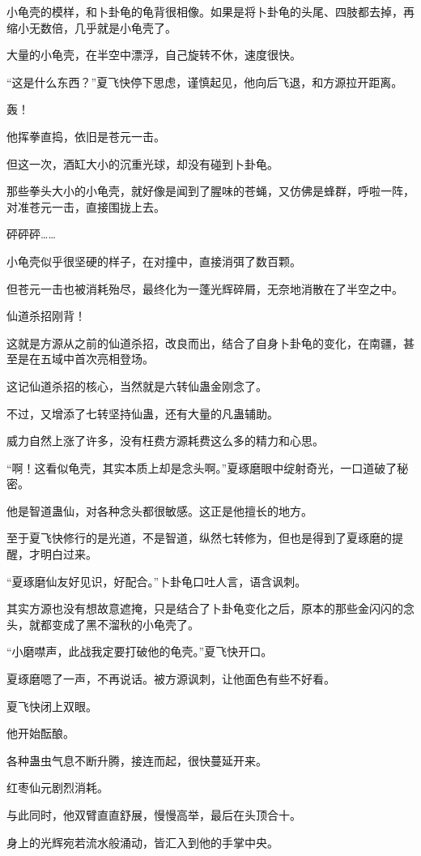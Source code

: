 \begin{this_body}
小龟壳的模样，和卜卦龟的龟背很相像。如果是将卜卦龟的头尾、四肢都去掉，再缩小无数倍，几乎就是小龟壳了。

大量的小龟壳，在半空中漂浮，自己旋转不休，速度很快。

“这是什么东西？”夏飞快停下思虑，谨慎起见，他向后飞退，和方源拉开距离。

轰！

他挥拳直捣，依旧是苍元一击。

但这一次，酒缸大小的沉重光球，却没有碰到卜卦龟。

那些拳头大小的小龟壳，就好像是闻到了腥味的苍蝇，又仿佛是蜂群，呼啦一阵，对准苍元一击，直接围拢上去。

砰砰砰……

小龟壳似乎很坚硬的样子，在对撞中，直接消弭了数百颗。

但苍元一击也被消耗殆尽，最终化为一蓬光辉碎屑，无奈地消散在了半空之中。

仙道杀招刚背！

这就是方源从之前的仙道杀招，改良而出，结合了自身卜卦龟的变化，在南疆，甚至是在五域中首次亮相登场。

这记仙道杀招的核心，当然就是六转仙蛊金刚念了。

不过，又增添了七转坚持仙蛊，还有大量的凡蛊辅助。

威力自然上涨了许多，没有枉费方源耗费这么多的精力和心思。

“啊！这看似龟壳，其实本质上却是念头啊。”夏琢磨眼中绽射奇光，一口道破了秘密。

他是智道蛊仙，对各种念头都很敏感。这正是他擅长的地方。

至于夏飞快修行的是光道，不是智道，纵然七转修为，但也是得到了夏琢磨的提醒，才明白过来。

“夏琢磨仙友好见识，好配合。”卜卦龟口吐人言，语含讽刺。

其实方源也没有想故意遮掩，只是结合了卜卦龟变化之后，原本的那些金闪闪的念头，就都变成了黑不溜秋的小龟壳了。

“小磨噤声，此战我定要打破他的龟壳。”夏飞快开口。

夏琢磨嗯了一声，不再说话。被方源讽刺，让他面色有些不好看。

夏飞快闭上双眼。

他开始酝酿。

各种蛊虫气息不断升腾，接连而起，很快蔓延开来。

红枣仙元剧烈消耗。

与此同时，他双臂直直舒展，慢慢高举，最后在头顶合十。

身上的光辉宛若流水般涌动，皆汇入到他的手掌中央。


\end{this_body}
